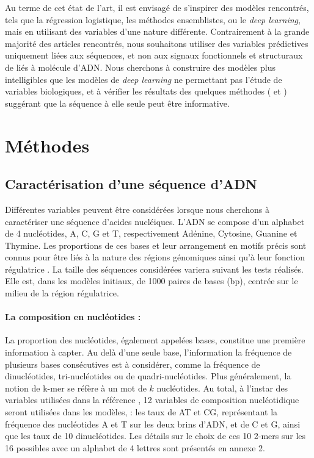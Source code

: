 \documentclass[french]{llncs}
\begin{document}
Au terme de cet état de l'art, il est envisagé de s'inspirer des modèles rencontrés, tels que la régression logistique, les méthodes ensemblistes, ou le \textit{deep learning}, mais en utilisant des variables d'une nature différente. Contrairement à la grande majorité des articles rencontrés, nous souhaitons utiliser des variables prédictives uniquement liées aux séquences, et non aux signaux fonctionnels et structuraux de liés à molécule d'ADN. Nous cherchons à construire des modèles plus intelligibles que les modèles de \textit{deep learning} ne permettant pas l'étude de variables biologiques, et à vérifier les résultats des quelques méthodes (\cite{yang2017exploiting} et \cite{singh_predicting_2018}) suggérant que la séquence à elle seule peut être informative.

\section{Méthodes}

\subsection{Caractérisation d'une séquence d'ADN}

Différentes variables peuvent être considérées lorsque nous cherchons à caractériser une séquence d'acides nucléiques. L'ADN se compose d'un alphabet de 4 nucléotides, A, C, G et T, respectivement Adénine, Cytosine, Guanine et Thymine. Les proportions de ces bases et leur arrangement en motifs précis sont connus pour être liés à la nature des régions génomiques ainsi qu'à leur fonction régulatrice \cite{vandel_probing_2019} \cite{bessiere_probing_2018}.
La taille des séquences considérées variera suivant les tests réalisés. Elle est, dans les modèles initiaux, de 1000 paires de bases (bp), centrée sur le milieu de la région régulatrice.

\paragraph{La composition en nucléotides : }
 La proportion des nucléotides, également appelées bases, constitue une première information à capter. Au delà d'une seule base, l'information la fréquence de plusieurs bases consécutives est à considérer, comme la fréquence de dinucléotides, tri-nucléotides ou de quadri-nucléotides. Plus généralement, la notion de k-mer se réfère à un mot de $k$ nucléotides. Au total, à l'instar des variables utilisées dans la référence \cite{vandel_probing_2019}, 12 variables de composition nucléotidique seront utilisées dans les modèles, : les taux de AT et CG, représentant la fréquence des nucléotides A et T sur les deux brins d'ADN, et de C et G, ainsi que les taux de 10 dinucléotides. Les détails sur le choix de ces 10 2-mers sur les 16 possibles avec un alphabet de 4 lettres sont présentés en annexe 2.
\end{document}
